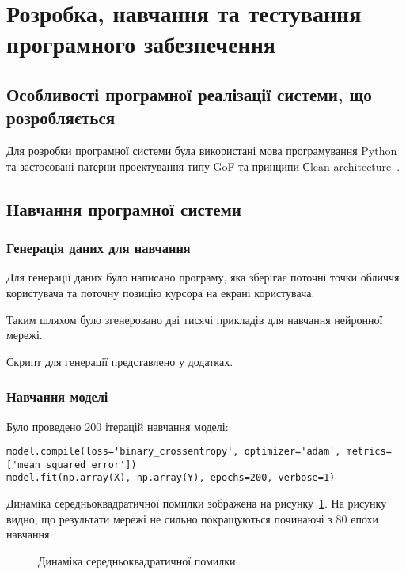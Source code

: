 \section{Розробка, навчання та тестування програмного забезпечення}
\subsection{Особливості програмної реалізації системи, що розробляється}
Для розробки програмної системи була використані мова програмування Python та застосовані патерни проектування типу GoF та принципи Сlean architecture~\cite{Martin2017}.

\subsection{Навчання програмної системи}
\subsubsection{Генерація даних для навчання}
Для генерації даних було написано програму, яка зберігає поточні точки обличчя користувача та поточну позицію курсора на екрані користувача.

Таким шляхом було згенеровано дві тисячі прикладів для навчання нейронної мережі.

Скрипт для генерації представлено у додатках.

\subsubsection{Навчання моделі}
Було проведено 200 ітерацій навчання моделі: 
\begin{lstlisting}
model.compile(loss='binary_crossentropy', optimizer='adam', metrics=['mean_squared_error'])
model.fit(np.array(X), np.array(Y), epochs=200, verbose=1)
\end{lstlisting}

Динаміка середньоквадратичної помилки зображена на рисунку~\ref{fig:results_training}.
На рисунку видно, що результати мережі не сильно покращуються починаючі з 80 епохи навчання. 

\begin{figure}[H]
    \centering
  \caption{Динаміка середньоквадратичної помилки}
  \label{fig:results_training}
\end{figure}

